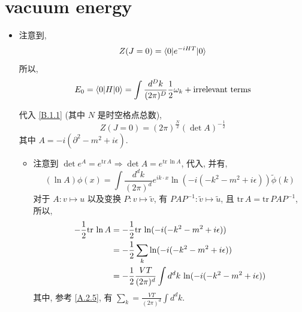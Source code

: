 \section{vacuum energy} \label{1.4}
\begin{itemize}
	\item 注意到,
	\begin{equation} \label{1.4.1}
		Z(J = 0) = \braket{0 | e^{- i H T} | 0}
	\end{equation}
	所以,
	\begin{equation}
		E_0 = \braket{0 | H | 0} = \int \frac{d^D k}{(2 \pi)^D} \frac{1}{2} \omega_k + \text{irrelevant terms}
	\end{equation}
	
	\begin{tcolorbox}[title=calculation:]
		代入 \eqref{B.1.1} (其中 $N$ 是时空格点总数),
		\begin{equation}
			Z(J = 0) = (2 \pi)^{\frac{N}{2}} (\det A)^{- \frac{1}{2}}
		\end{equation}
		其中 $A = - i (\partial^2 - m^2 + i \epsilon)$.
		\begin{itemize}
			\item 注意到 $\det e^A = e^{\mathrm{tr} \, A} \Longrightarrow \det A = e^{\mathrm{tr} \, \ln A}$, 代入, 并有,
			\begin{equation}
				(\ln A) \phi(x) = \int \frac{d^d k}{(2 \pi)^d} e^{i k \cdot x} \ln(- i (- k^2 - m^2 + i \epsilon)) \tilde{\phi}(k)
			\end{equation}
			对于 $A : v \mapsto u$ 以及变换 $P : v \mapsto \tilde{v}$, 有 $P A P^{- 1} : \tilde{v} \mapsto \tilde{u}$, 且 $\mathrm{tr} \, A = \mathrm{tr} \, P A P^{- 1}$, 所以,
			\begin{align}
				- \frac{1}{2} \mathrm{tr} \, \ln A &= - \frac{1}{2} \mathrm{tr} \, \ln(- i (- k^2 - m^2 + i \epsilon)) \notag \\
				&= - \frac{1}{2} \sum_k \ln(- i (- k^2 - m^2 + i \epsilon)) \notag \\
				&= - \frac{1}{2} \frac{V T}{(2 \pi)^d} \int d^d k \, \ln(- i (- k^2 - m^2 + i \epsilon))
			\end{align}
			其中, 参考 \eqref{A.2.5}, 有 $\sum_k = \frac{V T}{(2 \pi)^d} \int d^d k$.
		\end{itemize}
		

\end{tcolorbox}
\end{itemize}
